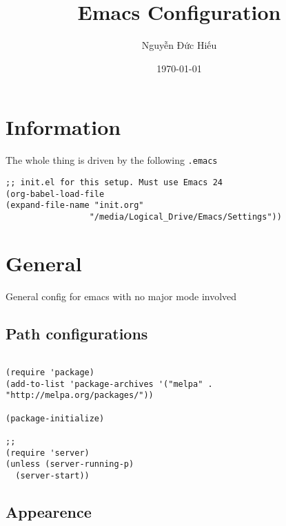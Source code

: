 \documentclass[11pt]{article}
\author{Nguyễn Đức Hiếu}
\date{\today}
\title{Emacs Configuration}
\begin{document}
\maketitle

\section{Information}
\label{sec:org50a49ee}

The whole thing is driven by the following \texttt{.emacs}

\begin{verbatim}
;; init.el for this setup. Must use Emacs 24
(org-babel-load-file
(expand-file-name "init.org"
                 "/media/Logical_Drive/Emacs/Settings"))
\end{verbatim}

\section{General}
\label{sec:orgd46d012}
General config for emacs with no major mode involved
\subsection{Path configurations}
\label{sec:orgc4d3cd2}

\begin{verbatim}

(require 'package)
(add-to-list 'package-archives '("melpa" . "http://melpa.org/packages/"))

(package-initialize)

;; 
(require 'server)
(unless (server-running-p)
  (server-start)) 
\end{verbatim}

\subsection{Appearence}
\label{sec:orgfc0e3dd}
\end{document}
